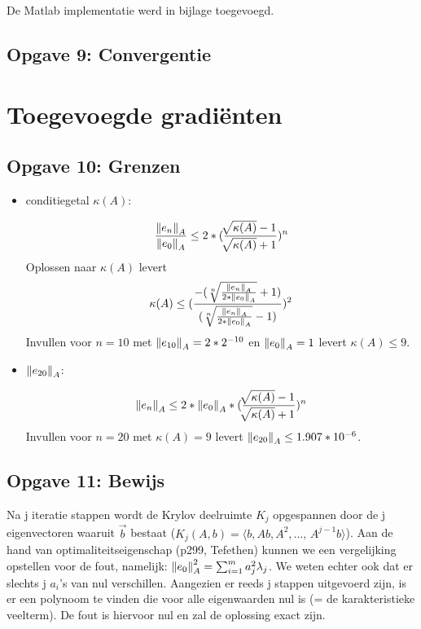 \documentclass[a4paper]{article}
\newcommand{\opgave}[1]{\subsection{Opgave #1}}
\begin{document}
De Matlab implementatie werd in bijlage toegevoegd.

\opgave{9: Convergentie}\label{sec:oef9}

\section{Toegevoegde gradi\"enten}\label{sec:CG}

\opgave{10: Grenzen}\label{sec:oef10}

\begin{itemize}
    	\item conditiegetal \(\kappa(A)\): \par\noindent
        \[\frac{\norm{e_n}_A}{\norm{e_0}_A} \leq 2*(\frac{\sqrt[]{\kappa(A)}-1}{\sqrt[]					{\kappa(A)}+1})^n\]
        Oplossen naar \(\kappa(A)\) levert
        \[\kappa(A) \leq (\frac{-(\sqrt[n]{\frac{\norm{e_n}_A}{2*\norm{e_0}_A}}+1)}						{(\sqrt[n]{\frac{\norm{e_n}_A}{2*\norm{e_0}_A}}-1)})^2\]
        Invullen voor \(n = 10\) met \(\norm{e_{10}}_A = 2*2^{-10}\) en \(\norm{e_0}_A = 1\) 			levert \(\kappa(A) \leq 9\).
        
        \item \(\norm{e_{20}}_A\): \par\noindent
        \[\norm{e_n}_A \leq 2*\norm{e_0}_A*(\frac{\sqrt[]{\kappa(A)}-1}{\sqrt[]							{\kappa(A)}+1})^n\]
        Invullen voor \(n = 20\) met \(\kappa(A) = 9\) levert \(\norm{e_{20}}_A \leq 					1.907*10^{-6}\).
	\end{itemize}

\opgave{11: Bewijs}\label{sec:oef11}
Na j iteratie stappen wordt de Krylov deelruimte $K_j$ opgespannen door de j eigenvectoren waaruit $\vec{b}$ bestaat ($K_j(A,b) = \langle b, Ab, A^2,\text{..., }A^{j-1}b \rangle $). Aan de hand van optimaliteitseigenschap (p299, Tefethen) kunnen we een vergelijking opstellen voor de fout, namelijk: $\norm{e_0}_A^2 = \sum_{i=1}^m a_j^2 \lambda_j$. We weten echter ook dat er slechts j $a_i$'s van nul verschillen. Aangezien er reeds j stappen uitgevoerd zijn, is er een polynoom te vinden die voor alle eigenwaarden nul is (= de karakteristieke veelterm). De fout is hiervoor nul en zal de oplossing exact zijn.
\end{document}
